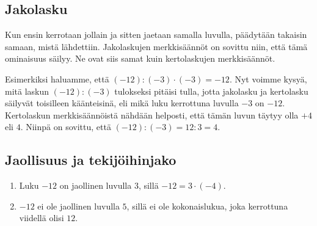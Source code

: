 \subsection*{Jakolasku}

        Kun ensin kerrotaan jollain ja sitten jaetaan samalla luvulla, päädytään takaisin samaan, mistä lähdettiin.  Jakolaskujen merkkisäännöt on sovittu niin, että tämä ominaisuus säilyy. Ne ovat siis samat kuin kertolaskujen merkkisäännöt.
    
    Esimerkiksi haluamme, että $(-12):(-3)\cdot (-3)=-12$. Nyt voimme kysyä, mitä laskun $(-12):(-3)$ tulokseksi pitäisi tulla, jotta jakolasku ja kertolasku säilyvät toisilleen käänteisinä, eli mikä luku kerrottuna luvulla $-3$ on $-12$. Kertolaskun merkkisäännöistä nähdään helposti, että tämän luvun täytyy olla $+4$ eli $4$. Niinpä on sovittu, että $(-12):(-3)=12:3=4$.



    \subsection*{Jaollisuus ja tekijöihinjako}

   
    
    \begin{esimerkki}
    \begin{enumerate}
    \item Luku $-12$ on jaollinen luvulla $3$, sillä $-12 = 3 \cdot (-4)$.
    \item $-12$ ei ole jaollinen luvulla $5$, sillä ei ole kokonaislukua, joka kerrottuna viidellä olisi $12$.
    \end{enumerate}
    \end{esimerkki}
    
